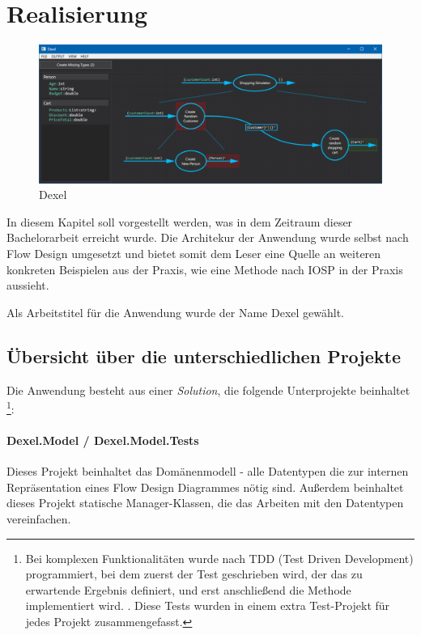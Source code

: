 


\chapter{Realisierung }

	\begin{figure}[H]
		\centering
		\includegraphics[width=1\linewidth]{./img/Dexel.png} 
		\caption{Dexel}
	\end{figure}



In diesem Kapitel soll vorgestellt werden, was in dem Zeitraum dieser
Bachelorarbeit erreicht wurde. Die Architekur der Anwendung wurde selbst nach
Flow Design umgesetzt und bietet somit dem Leser eine Quelle an weiteren
konkreten Beispielen aus der Praxis, wie eine Methode nach IOSP in der Praxis aussieht.

Als Arbeitstitel für die Anwendung wurde der Name Dexel gewählt.

\section{Übersicht über die unterschiedlichen Projekte}

Die Anwendung besteht aus einer \textit{Solution}, die folgende Unterprojekte beinhaltet \footnote{Bei komplexen Funktionalitäten wurde nach TDD (Test Driven Development)
programmiert, bei dem zuerst der Test geschrieben wird, der das zu erwartende
Ergebnis definiert, und erst anschließend die Methode implementiert wird.
. Diese Tests wurden in einem extra Test-Projekt für jedes Projekt zusammengefasst.}:

\subsubsection{Dexel.Model / Dexel.Model.Tests}

Dieses Projekt beinhaltet das Domänenmodell - alle Datentypen die zur internen Repräsentation
eines Flow Design Diagrammes nötig sind. Außerdem beinhaltet dieses Projekt
statische Manager-Klassen, die das Arbeiten mit den Datentypen vereinfachen.

